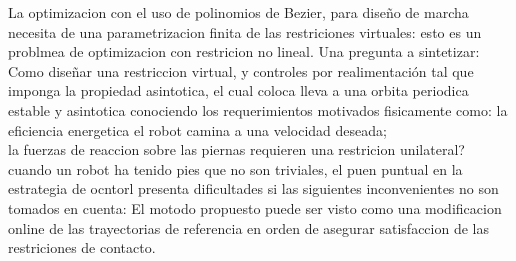 \documentclass[10pt,onecolumn,twoside,letterpaper]{article}
\begin{document}
{%
}\cite{Grizzle2014}
La optimizacion con el uso de polinomios de Bezier, para dise\~no de marcha necesita de una parametrizacion finita de las restriciones virtuales: esto es un problmea de optimizacion con restricion no lineal. Una pregunta a sintetizar: Como dise\~nar una restriccion virtual, y controles por realimentaci\'on tal que imponga la propiedad asintotica, el cual coloca lleva a una orbita periodica estable y asintotica conociendo los requerimientos motivados fisicamente como: la eficiencia energetica el robot camina a una velocidad deseada; \\
la fuerzas de reaccion sobre las piernas requieren una restricion unilateral? cuando un robot ha tenido pies que no son triviales, el puen puntual en la estrategia de ocntorl presenta dificultades si las siguientes inconvenientes no son tomados en cuenta: El motodo propuesto puede ser visto como una modificacion online de las trayectorias de referencia en orden de asegurar satisfaccion de las restriciones de contacto.\cite{Grizzle2014}\\
\end{document}
